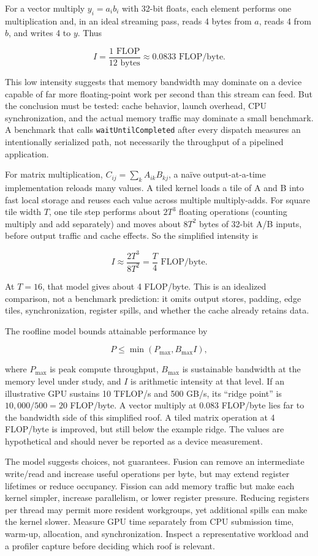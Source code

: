 For a vector multiply \(y_i=a_i b_i\) with 32-bit floats, each element performs one multiplication and, in an ideal streaming pass, reads 4 bytes from \(a\), reads 4 from \(b\), and writes 4 to \(y\). Thus

\[
I=\frac{1\text{ FLOP}}{12\text{ bytes}}\approx0.0833\text{ FLOP/byte}.
\]

This low intensity suggests that memory bandwidth may dominate on a device capable of far more floating-point work per second than this stream can feed. But the conclusion must be tested: cache behavior, launch overhead, CPU synchronization, and the actual memory traffic may dominate a small benchmark. A benchmark that calls \texttt{waitUntilCompleted} after every dispatch measures an intentionally serialized path, not necessarily the throughput of a pipelined application.

For matrix multiplication, \(C_{ij}=\sum_k A_{ik}B_{kj}\), a naïve output-at-a-time implementation reloads many values. A tiled kernel loads a tile of A and B into fast local storage and reuses each value across multiple multiply-adds. For square tile width \(T\), one tile step performs about \(2T^3\) floating operations (counting multiply and add separately) and moves about \(8T^2\) bytes of 32-bit A/B inputs, before output traffic and cache effects. So the simplified intensity is

\[
I\approx\frac{2T^3}{8T^2}=\frac{T}{4}\text{ FLOP/byte}.
\]

At \(T=16\), that model gives about 4 FLOP/byte. This is an idealized comparison, not a benchmark prediction: it omits output stores, padding, edge tiles, synchronization, register spills, and whether the cache already retains data.

The roofline model bounds attainable performance by

\[
P\le \min(P_{\max}, B_{\max} I),
\]

where \(P_{\max}\) is peak compute throughput, \(B_{\max}\) is sustainable bandwidth at the memory level under study, and \(I\) is arithmetic intensity at that level. If an illustrative GPU sustains 10 TFLOP/s and 500 GB/s, its ``ridge point'' is \(10{,}000/500=20\) FLOP/byte. A vector multiply at 0.083 FLOP/byte lies far to the bandwidth side of this simplified roof. A tiled matrix operation at 4 FLOP/byte is improved, but still below the example ridge. The values are hypothetical and should never be reported as a device measurement.

The model suggests choices, not guarantees. Fusion can remove an intermediate write/read and increase useful operations per byte, but may extend register lifetimes or reduce occupancy. Fission can add memory traffic but make each kernel simpler, increase parallelism, or lower register pressure. Reducing registers per thread may permit more resident workgroups, yet additional spills can make the kernel slower. Measure GPU time separately from CPU submission time, warm-up, allocation, and synchronization. Inspect a representative workload and a profiler capture before deciding which roof is relevant.

